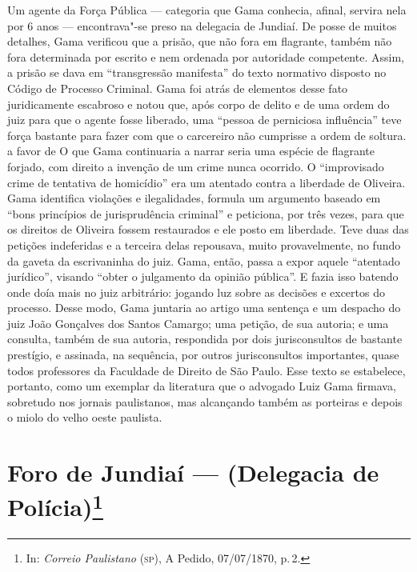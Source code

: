 {\small\noindent
Um agente da Força Pública --- categoria que Gama conhecia,
afinal, servira nela por 6 anos --- encontrava"-se preso
na delegacia de Jundiaí. De posse de muitos detalhes,
Gama verificou que a prisão, que não fora em flagrante, também não fora
determinada por escrito e nem ordenada por autoridade competente.
Assim, a prisão se dava em ``transgressão manifesta'' do texto
normativo disposto no Código de Processo Criminal. Gama foi atrás de
elementos desse fato juridicamente escabroso e notou que, após corpo de
delito e de uma ordem do juiz para que o agente fosse liberado,
uma ``pessoa de perniciosa influência'' teve força bastante para
fazer com que o
carcereiro não cumprisse a ordem de soltura. a favor de
O que Gama continuaria a narrar seria uma espécie de flagrante forjado, com direito a invenção
de um crime nunca ocorrido. O ``improvisado crime de
tentativa de homicídio'' era um atentado contra a liberdade de
Oliveira. Gama identifica violações e ilegalidades,
formula um argumento baseado em ``bons princípios de jurisprudência
criminal'' e peticiona, por três vezes, para que os direitos
de Oliveira fossem restaurados e ele posto em liberdade. Teve duas das
petições indeferidas e a terceira delas repousava, muito provavelmente,
no fundo da gaveta da escrivaninha do juiz. Gama, então, passa a expor
aquele ``atentado jurídico'', visando ``obter o julgamento da opinião pública''.
E fazia isso batendo onde doía mais no
juiz arbitrário: jogando luz sobre as decisões e excertos do processo.
Desse modo, Gama juntaria ao artigo uma sentença e um despacho do
juiz João Gonçalves dos Santos Camargo; uma petição, de sua autoria; e
uma consulta, também de sua autoria, respondida por dois jurisconsultos
de bastante prestígio, e assinada, na
sequência, por outros jurisconsultos importantes, quase todos
professores da Faculdade de Direito de São Paulo. Esse texto se
estabelece, portanto, como um exemplar da literatura
que o advogado Luiz Gama firmava, sobretudo nos
jornais paulistanos, mas alcançando
também as porteiras e depois o miolo do velho oeste paulista. }

\chapter{Foro de Jundiaí --- (Delegacia de Polícia)\footnote[*]{In: \emph{Correio Paulistano} (\textsc{sp}), A Pedido,
  07/07/1870, p.\,2.}}


